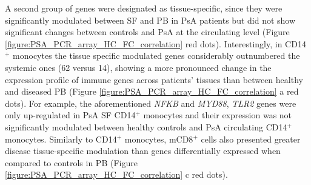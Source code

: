 A second group of genes were designated as tissue-specific, since they were significantly modulated between SF and PB in PsA patients but did not show significant changes between controls and PsA at the circulating level (Figure \ref{figure:PSA_PCR_array_HC_FC_correlation} red dots). Interestingly, in CD14$^+$ monocytes the tissue specific modulated genes considerably outnumbered the systemic ones (62 versus 14), showing a more pronounced change in the expression profile of immune genes across patients' tissues than between healthy and diseased PB (Figure \ref{figure:PSA_PCR_array_HC_FC_correlation} a red dots). For example, the aforementioned \textit{NFKB} and \textit{MYD88}, \textit{TLR2} genes were only up-regulated in PsA SF CD14$^+$ monocytes and their expression was not significantly modulated between healthy controls and PsA circulating CD14$^+$ monocytes.  Similarly to CD14$^+$ monocytes, mCD8$^+$ cells also presented greater disease tissue-specific modulation than genes differentially expressed when compared to controls in PB (Figure \ref{figure:PSA_PCR_array_HC_FC_correlation} c red dots).  

